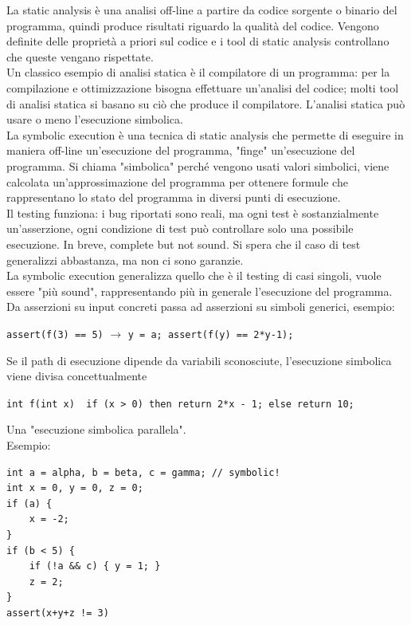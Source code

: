 La static analysis è una analisi off-line a partire da codice sorgente o binario del programma, quindi produce risultati riguardo la qualità del codice. Vengono definite delle proprietà a priori sul codice e i tool di static analysis controllano che queste vengano rispettate. \\

Un classico esempio di analisi statica è il compilatore di un programma: per la compilazione e ottimizzazione bisogna effettuare un'analisi del codice; molti tool di analisi statica si basano su ciò che produce il compilatore. L'analisi statica può usare o meno l'esecuzione simbolica.\\

La symbolic execution è una tecnica di static analysis che permette di eseguire in maniera off-line un'esecuzione del programma, "finge" un'esecuzione del programma. Si chiama "simbolica" perché vengono usati valori simbolici, viene calcolata un'approssimazione del programma per ottenere formule che rappresentano lo stato del programma in diversi punti di esecuzione. \\

Il testing funziona: i bug riportati sono reali, ma ogni test è sostanzialmente un'asserzione, ogni condizione di test può controllare solo una possibile esecuzione. In breve, complete but not sound. Si spera che il caso di test generalizzi abbastanza, ma non ci sono garanzie.\\

La symbolic execution generalizza quello che è il testing di casi singoli, vuole essere "più sound", rappresentando più in generale l'esecuzione del programma. Da asserzioni su input concreti passa ad asserzioni su simboli generici, esempio: 
\begin{center}
	\texttt{assert(f(3) == 5)} $\longrightarrow$ \texttt{y = a; assert(f(y) == 2*y-1);}
\end{center}

Se il path di esecuzione dipende da variabili sconosciute, l'esecuzione simbolica viene divisa concettualmente
\begin{center}
	\texttt{int f(int x) { if (x > 0) then return 2*x - 1; else return 10; }}
\end{center}
Una "esecuzione simbolica parallela".\\

Esempio: 
\begin{center}
	\begin{minipage}{0.78\linewidth}
		\begin{verbatim}
int a = alpha, b = beta, c = gamma; // symbolic!
int x = 0, y = 0, z = 0;
if (a) {
	x = -2;
}
if (b < 5) {
	if (!a && c) { y = 1; }
	z = 2;
}
assert(x+y+z != 3)
		\end{verbatim}
	\end{minipage}
\end{center}

